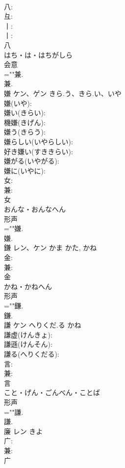 \documentclass[8pt]{extreport}
\begin{document}
\begin{CJK}{UTF8}{min}
\\	八: 
\\	彑: 
\\	丨: 
\\	丨: 
\\	八	
\\	はち・は・はちがしら	
\\	会意 
\\	=""兼.
\\	兼.
\\	嫌	ケン、ゲン	きら.う、きら.い、いや		
\\	嫌(いや): 
\\	嫌い(きらい): 
\\	機嫌(きげん): 
\\	嫌う(きらう): 
\\	嫌らしい(いやらしい): 
\\	好き嫌い(すききらい): 
\\	嫌がる(いやがる): 
\\	嫌に(いやに): 
\\	女: 
\\	兼: 
\\	女	
\\	おんな・おんなへん	
\\	形声 
\\	=""嫌.
\\	嫌.
\\	鎌	レン、ケン	かま	かた, かね	
\\	金: 
\\	兼: 
\\	金	
\\	かね・かねへん	
\\	形声 
\\	=""鎌.
\\	鎌.
\\	謙	ケン	へりくだ.る	かね	
\\	謙虚(けんきょ): 
\\	謙遜(けんそん): 
\\	謙る(へりくだる): 
\\	言: 
\\	兼: 
\\	言	
\\	こと・げん・ごんべん・ことば	
\\	形声 
\\	=""謙.
\\	謙.
\\	廉	レン		きよ	
\\	广: 
\\	兼: 
\\	广	

\end{CJK}
\end{document}
